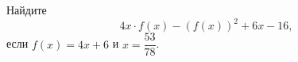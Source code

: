 \begin{ex}
	\begin{condition}
		Найдите \[ 4x\cdot f(x)-(f(x))^2 +6x -16, \] если \( f(x)=4x+6 \) и \( x=\dfrac{53}{78} \).
	\end{condition}
\end{ex}